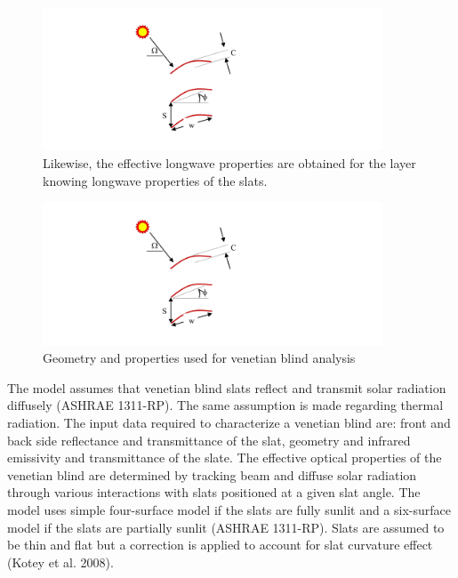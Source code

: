 \begin{figure}[hbtp] %
\centering
\includegraphics[width=0.9\textwidth, height=0.9\textheight, keepaspectratio=true]{media/image1845.svg.png}
\caption{Likewise, the effective longwave properties are obtained for the layer knowing longwave properties of the slats. \protect \label{fig:likewise-the-effective-longwave-properties}}
\end{figure}

\begin{figure}[hbtp] %
\centering
\includegraphics[width=0.9\textwidth, height=0.9\textheight, keepaspectratio=true]{media/image1846.svg.png}
\caption{Geometry and properties used for venetian blind analysis \protect \label{fig:geometry-and-properties-used-for-venetian}}
\end{figure}

The model assumes that venetian blind slats reflect and transmit solar radiation diffusely (ASHRAE 1311-RP). The same assumption is made regarding thermal radiation. The input data required to characterize a venetian blind are: front and back side reflectance and transmittance of the slat, geometry and infrared emissivity and transmittance of the slate. The effective optical properties of the venetian blind are determined by tracking beam and diffuse solar radiation through various interactions with slats positioned at a given slat angle. The model uses simple four-surface model if the slats are fully sunlit and a six-surface model if the slats are partially sunlit (ASHRAE 1311-RP). Slats are assumed to be thin and flat but a correction is applied to account for slat curvature effect (Kotey et al. 2008).

